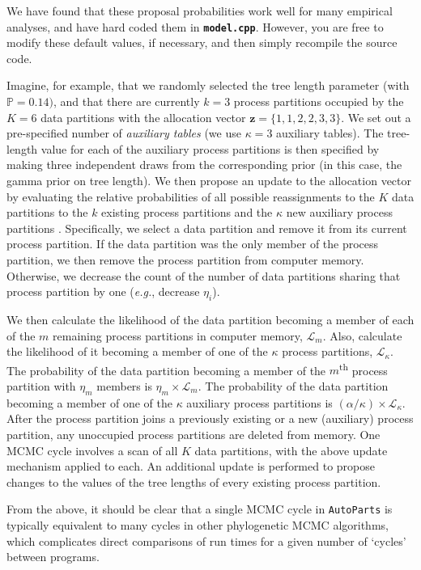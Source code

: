 \documentclass[11pt]{article}
\newcommand{\cl}[1]{{\texttt{\textbf{#1}}}}
\begin{document}
We have found that these proposal probabilities work well for many empirical analyses, and have hard coded them in \cl{model.cpp}.
However, you are free to modify these default values, if necessary, and then simply recompile the source code.
 
Imagine, for example, that we randomly selected the tree length parameter (with $\mathbb{P} = 0.14)$, and that there are currently $k = 3$ process partitions occupied by the $K = 6$ data partitions with the allocation vector $\mathbf{z}=\{1,1,2,2,3,3\}$.
We set out a pre-specified number of \emph{auxiliary tables} (we use $\kappa = 3$ auxiliary tables).
The tree-length value for each of the auxiliary process partitions is then specified by making three independent draws from the corresponding prior (in this case, the gamma prior on tree length).
We then propose an update to the allocation vector by evaluating the relative probabilities of all possible reassignments to the $K$ data partitions to the $k$ existing process partitions and the $\kappa$ new auxiliary process partitions \citep[][]{neal00}. 
Specifically, we select a data partition and remove it from its current process partition.
If the data partition was the only member of the process partition, we then remove the process partition from computer memory.
Otherwise, we decrease the count of the number of data partitions sharing that process partition by one ({\it e.g.}, decrease $\eta_i$).

We then calculate the likelihood of the data partition becoming a member of each of the $m$ remaining process partitions in computer memory, $\mathcal{L}_m$.
Also, calculate the likelihood of it becoming a member of one of the $\kappa$ process partitions, $\mathcal{L}_{\kappa}$.
The probability of the data partition becoming a member of the $m$\textsuperscript{th} process partition with $\eta_m$ members is $\eta_m \times \mathcal{L}_m$.
The probability of the data partition becoming a member of one of the $\kappa$ auxiliary process partitions is $(\alpha/ \kappa) \times \mathcal{L}_{\kappa}$.
After the process partition joins a previously existing or a new (auxiliary) process partition, any unoccupied process partitions are deleted from memory.
One MCMC cycle involves a scan of all $K$ data partitions, with the above update mechanism applied to each.
An additional update is performed to propose changes to the values of the tree lengths of every existing process partition. 

From the above, it should be clear that a single MCMC cycle in \verb!AutoParts! is typically equivalent to many cycles in other phylogenetic MCMC algorithms, which complicates direct comparisons of run times for a given number of `cycles'  between programs.  
\end{document}
